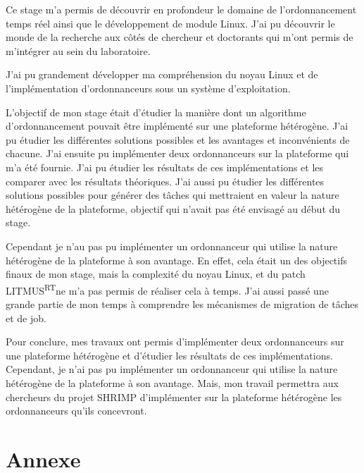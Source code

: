 \documentclass[11pt]{article}
\newcommand{\litmus}{LITMUS\textsuperscript{RT}}
\begin{document}
    Ce stage m'a permis de découvrir en profondeur le domaine de l'ordonnancement temps réel ainsi que le développement de module Linux. J'ai pu découvrir le monde de la recherche aux côtés de chercheur et doctorants qui m'ont permis de m'intégrer au sein du laboratoire.
    
    J'ai pu grandement développer ma compréhension du noyau Linux et de l'implémentation d'ordonnanceurs sous un système d'exploitation. 

    L'objectif de mon stage était d'étudier la manière dont un algorithme d'ordonnancement pouvait être implémenté sur une plateforme hétérogène. J'ai pu étudier les différentes solutions possibles et les avantages et inconvénients de chacune. J'ai ensuite pu implémenter deux ordonnanceurs sur la plateforme qui m'a été fournie. J'ai pu étudier les résultats de ces implémentations et les comparer avec les résultats théoriques. J'ai aussi pu étudier les différentes solutions possibles pour générer des tâches qui mettraient en valeur la nature hétérogène de la plateforme, objectif qui n'avait pas été envisagé au début du stage.

    Cependant je n'au pas pu implémenter un ordonnanceur qui utilise la nature hétérogène de la plateforme à son avantage. En effet, cela était un des objectifs finaux de mon stage, mais la complexité du noyau Linux, et du patch \litmus ne m'a pas permis de réaliser cela à temps. J'ai aussi passé une grande partie de mon temps à comprendre les mécanismes de migration de tâches et de job.

    Pour conclure, mes travaux ont permis d'implémenter deux ordonnanceurs sur une plateforme hétérogène et d'étudier les résultats de ces implémentations. Cependant, je n'ai pas pu implémenter un ordonnanceur qui utilise la nature hétérogène de la plateforme à son avantage. Mais, mon travail permettra aux chercheurs du projet SHRIMP d'implémenter sur la plateforme hétérogène les ordonnanceurs qu'ils concevront.
     

    \newpage

    \newpage
    \printnoidxglossaries %

    \newpage
    \listoffigures
    \lstlistoflistings



    \newpage
    \section*{Annexe}
    


    
\end{document}
